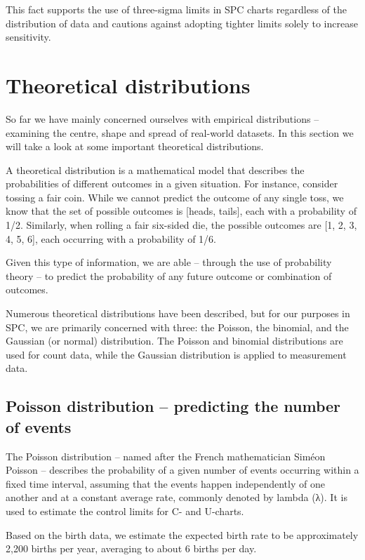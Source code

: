 \documentclass[
]{book}
\begin{document}
This fact supports the use of three-sigma limits in SPC charts regardless of the distribution of data and cautions against adopting tighter limits solely to increase sensitivity.

\section{Theoretical distributions}\label{theoretical-distributions}

So far we have mainly concerned ourselves with empirical distributions -- examining the centre, shape and spread of real-world datasets. In this section we will take a look at some important theoretical distributions.

A theoretical distribution is a mathematical model that describes the probabilities of different outcomes in a given situation. For instance, consider tossing a fair coin. While we cannot predict the outcome of any single toss, we know that the set of possible outcomes is {[}heads, tails{]}, each with a probability of 1/2. Similarly, when rolling a fair six-sided die, the possible outcomes are {[}1, 2, 3, 4, 5, 6{]}, each occurring with a probability of 1/6.

Given this type of information, we are able -- through the use of probability theory -- to predict the probability of any future outcome or combination of outcomes.

Numerous theoretical distributions have been described, but for our purposes in SPC, we are primarily concerned with three: the Poisson, the binomial, and the Gaussian (or normal) distribution. The Poisson and binomial distributions are used for count data, while the Gaussian distribution is applied to measurement data.

\subsection{Poisson distribution -- predicting the number of events}\label{poisson-distribution-predicting-the-number-of-events}

The Poisson distribution -- named after the French mathematician Siméon Poisson -- describes the probability of a given number of events occurring within a fixed time interval, assuming that the events happen independently of one another and at a constant average rate, commonly denoted by lambda (λ). It is used to estimate the control limits for C- and U-charts.

Based on the birth data, we estimate the expected birth rate to be approximately 2,200 births per year, averaging to about 6 births per day.
\end{document}
